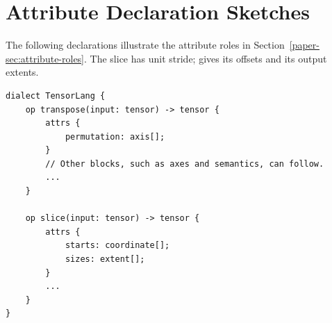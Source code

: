 \section{Attribute Declaration Sketches}
\label{supp-app:language-declarations}
The following declarations illustrate the attribute roles in
Section~\ref{paper-sec:attribute-roles}. The slice has unit stride;
 gives its offsets and  its output extents.

\begin{lstlisting}[language=TEPL]
dialect TensorLang {
    op transpose(input: tensor) -> tensor {
        attrs {
            permutation: axis[];
        }
        // Other blocks, such as axes and semantics, can follow.
        ...
    }

    op slice(input: tensor) -> tensor {
        attrs {
            starts: coordinate[];
            sizes: extent[];
        }
        ...
    }
}
\end{lstlisting}
